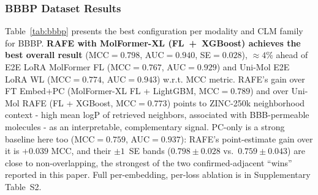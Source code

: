 \documentclass[pdflatex,sn-mathphys-num]{sn-jnl}%
\begin{document}
\subsubsection{BBBP Dataset Results}
Table~\ref{tab:bbbp} presents the best configuration per modality and CLM family for BBBP. \textbf{RAFE with MolFormer-XL (FL~+~XGBoost) achieves the best overall result} (MCC$=0.798$, AUC$=0.940$, SE$=0.028$), $\approx 4\%$ ahead of E2E LoRA MolFormer FL (MCC$=0.767$, AUC$=0.929$) and Uni-Mol E2E LoRA WL (MCC$=0.774$, AUC$=0.943$) w.r.t. MCC metric. RAFE's gain over FT Embed+PC (MolFormer-XL FL + LightGBM, MCC$=0.789$) and over Uni-Mol RAFE (FL + XGBoost, MCC$=0.773$) points to ZINC-250k neighborhood context - high mean logP of retrieved neighbors, associated with BBB-permeable molecules - as an interpretable, complementary signal. PC-only is a strong baseline here too (MCC$=0.759$, AUC$=0.937$): RAFE's point-estimate gain over it is $+0.039$ MCC, and their $\pm1$~SE bands ($0.798\pm0.028$ vs.\ $0.759\pm0.043$) are close to non-overlapping, the strongest of the two confirmed-adjacent ``wins'' reported in this paper. Full per-embedding, per-loss ablation is in Supplementary Table~S2.

\begin{table}[!ht]
\centering
\caption{Best performing configurations for each modality/baseline on BBBP. $^*$ denotes overall best by MCC. RAFE = FT~Embed~+~PC~+~ZINC-250k retrieval features. PC-only / Chemprop / GCN are run in-house on the identical split.}
\label{tab:bbbp}
\end{table}
\end{document}
